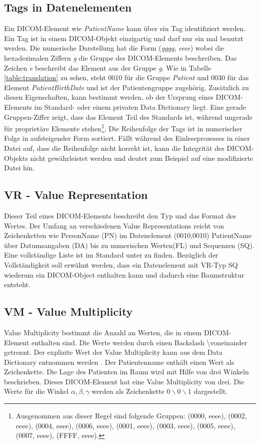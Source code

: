 \FloatBarrier
\subsection{Tags in Datenelementen}

Ein DICOM-Element wie \textit{PatientName} kann über ein Tag identifiziert werden. Ein Tag ist in einem DICOM-Objekt einzigartig und darf nur ein mal benutzt werden. Die numerische Darstellung hat die Form (\textit{gggg}, \textit{eeee}) wobei die hexadezimalen Ziffern \textit{g} die Gruppe des DICOM-Elements beschreiben. Das Zeichen \textit{e} beschreibt das Element  aus der Gruppe \textit{g}. Wie in Tabelle  \ref{table:translation} zu sehen, steht 0010 für die Gruppe \textit{Patient} und 0030 für das Element \textit{PatientBirthDate} und ist der Patientengruppe zugehörig. Zusätzlich zu diesen Eigenschaften, kann bestimmt werden, ob der Ursprung eines DICOM-Elements im Standard- oder einem privaten Data Dictionary liegt. Eine gerade Gruppen-Ziffer zeigt, dass das Element Teil des Standards ist, während ungerade für proprietäre Elemente stehen\footnote{Ausgenommen aus dieser Regel sind folgende Gruppen: (0000, eeee), (0002, eeee), (0004, eeee), (0006, eeee), (0001, eeee), (0003, eeee), (0005, eeee), (0007, eeee), (FFFF, eeee).}\cite[7.1]{dicom:structure}. Die Reihenfolge der Tags ist in numerischer Folge in aufsteigender Form sortiert. Fällt während des Einleseprozesses in einer Datei auf, dass die Reihenfolge nicht korrekt ist, kann die Integrität des DICOM-Objekts nicht gewährleistet werden und deutet zum Beispiel auf eine modifizierte Datei hin.\\

\FloatBarrier
\subsection{VR - Value Representation}
Dieser Teil eines DICOM-Elements beschreibt den Typ und das Format des Wertes\cite[6.2]{dicom:structure}. Der Umfang an verschiedenen Value Representations reicht von Zeichenketten wie PersonName (PN) im Datenelement (0010,0010) PatientName über Datumsangaben (DA) bis zu numerischen Werten(FL) und Sequenzen (SQ). Eine vollständige Liste ist im Standard unter \cite[Table 6.2.1]{dicom:structure} zu finden.
Bezüglich der Vollständigkeit soll erwähnt werden, dass ein Datenelement mit VR-Typ SQ wiederum ein DICOM-Object enthalten kann und dadurch eine Baumstruktur entsteht.

\FloatBarrier
\subsection{VM - Value Multiplicity}
Value Multiplicity bestimmt die Anzahl an Werten, die in einem DICOM-Element enthalten sind. Die Werte werden durch einen Backslash \textbackslash voneinander getrennt. Der explizite Wert der Value Multiplicity kann aus dem Data Dictionary entnommen werden \cite[6.4]{dicom:structure}. Der Patientenname enthält einen Wert als Zeichenkette.
\pagebreak
 Die Lage des Patienten im Raum wird mit Hilfe von drei Winkeln beschrieben. Dieses DICOM-Element hat eine Value Multiplicity von drei. Die Werte für die Winkel $\alpha, \beta, \gamma$ werden als Zeichenkette \textit{$0\backslash0\backslash1$} dargestellt.

